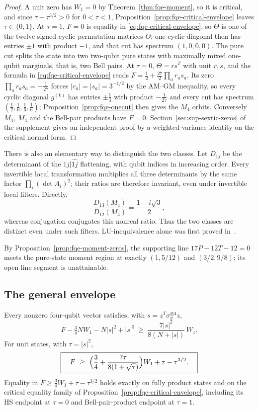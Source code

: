 \begin{proof}
A unit zero has $W_1=0$ by Theorem~\ref{thm:fqe-moment}, so it is critical, and since $\tau-\tau^{3/2}>0$ for
$0<\tau<1$, Proposition~\ref{prop:fqe-critical-envelope} leaves $\tau\in\{0,1\}$. At $\tau=1$, $F=0$ is equality in
\eqref{eq:fqe-critical-envelope}, so $\Theta$ is one of the twelve signed cyclic permutation matrices $O$; one cyclic
diagonal then has entries $\pm1$ with product $-1$, and that cut has spectrum $(1,0,0,0)$. The pure cut splits the
state into two two-qubit pure states with maximally mixed one-qubit marginals, that is, two Bell pairs. At $\tau=0$,
$\Theta=rs^T$ with unit $r,s$, and the formula in \eqref{eq:fqe-critical-envelope} reads $F=\frac12+\frac{27}2\prod_ar_as_a$.
Its zero $\prod_ar_as_a=-\frac1{27}$ forces $|r_a|=|s_a|=3^{-1/2}$ by the AM--GM inequality, so every cyclic diagonal
$g^{(k)}$ has entries $\pm\frac13$ with product $-\frac1{27}$ and every cut has spectrum $(\frac12,\frac16,\frac16,\frac16)$;
Proposition~\ref{prop:fqe-onecut} then gives the $M_4$ orbits. Conversely $M_4$, $\overline{M_4}$ and the Bell-pair
products have $F=0$. Section~\ref{sec:sup-sextic-zeros} of the supplement gives an independent proof by a
weighted-variance identity on the critical normal form.
\end{proof}

There is also an elementary way to distinguish the two classes. Let \(D_{1j}\) be the determinant of
the \(1j|\widehat{1j}\) flattening, with qubit indices in increasing order. Every invertible local
transformation multiplies all three determinants by the same factor \(\prod_i(\det A_i)^2\); their
ratios are therefore invariant, even under invertible local filters. Directly, \[
\frac{D_{13}(M_4)}{D_{12}(M_4)}=\frac{1-i\sqrt3}{2},
\] whereas conjugation conjugates this nonreal ratio. Thus the two classes are distinct even under
such filters. LU-inequivalence alone was first proved in~\cite[Prop.~7]{LWB}.

By Proposition~\ref{prop:fqe-moment-zeros}, the supporting line \(17P-12T-12=0\) meets the pure-state
moment region at exactly \((1,5/12)\) and \((3/2,9/8)\); its open line segment is unattainable.

\subsection{The general envelope}\label{sec:fqe-general-envelope}

\begin{theorem}\label{thm:fqe-general-envelope}
Every nonzero four-qubit vector satisfies, with $s=z^T\sigma_y^{\otimes4}z$,
\[
 F-\tfrac34NW_1-N|s|^2+|s|^3\ \ge\ \frac{7|s|^2}{8(N+|s|)}\,W_1 .
 \tag{GE}\label{eq:fqe-general-envelope}
\]
For unit states, with $\tau=|s|^2$,
\[
 \boxed{\quad F\ \ge\ \Bigl(\frac34+\frac{7\tau}{8(1+\sqrt\tau)}\Bigr)W_1+\tau-\tau^{3/2}.\quad}
\]
Equality in $F\ge\frac34W_1+\tau-\tau^{3/2}$ holds exactly on fully product states and on the critical
equality family of Proposition~\ref{prop:fqe-critical-envelope}, including its HS endpoint at $\tau=0$ and
Bell-pair-product endpoint at $\tau=1$.
\end{theorem}


